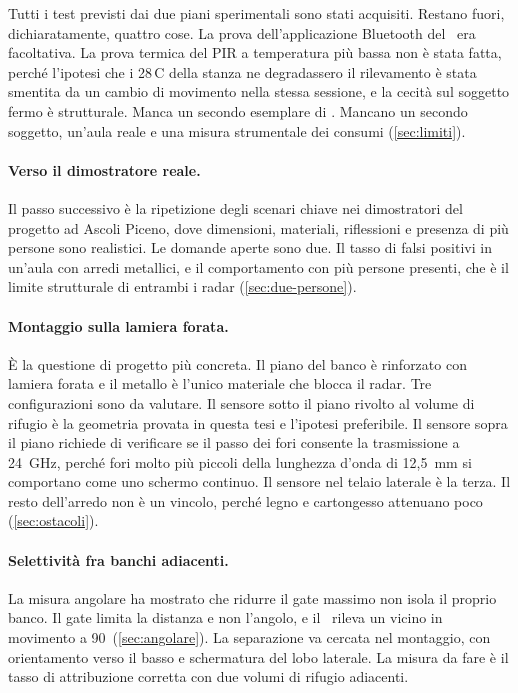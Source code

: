 Tutti i test previsti dai due piani sperimentali sono stati acquisiti. Restano fuori,
dichiaratamente, quattro cose. La prova dell'applicazione Bluetooth del \ldb\ era
facoltativa. La prova termica del PIR a temperatura più bassa non è stata fatta,
perché l'ipotesi che i 28\,\textdegree C della stanza ne degradassero il rilevamento è
stata smentita da un cambio di movimento nella stessa sessione, e la cecità sul
soggetto fermo è strutturale. Manca un secondo esemplare di \ldc. Mancano un secondo
soggetto, un'aula reale e una misura strumentale dei consumi (\cref{sec:limiti}).

\paragraph{Verso il dimostratore reale.} Il passo successivo è la ripetizione degli
scenari chiave nei dimostratori del progetto ad Ascoli Piceno, dove dimensioni,
materiali, riflessioni e presenza di più persone sono realistici. Le domande aperte
sono due. Il tasso di falsi positivi in un'aula con arredi metallici, e il
comportamento con più persone presenti, che è il limite strutturale di entrambi i
radar (\cref{sec:due-persone}).

\paragraph{Montaggio sulla lamiera forata.} È la questione di progetto più concreta.
Il piano del banco è rinforzato con lamiera forata e il metallo è l'unico materiale
che blocca il radar. Tre configurazioni sono da valutare. Il sensore sotto il piano
rivolto al volume di rifugio è la geometria provata in questa tesi e l'ipotesi
preferibile. Il sensore sopra il piano richiede di verificare se il passo dei fori
consente la trasmissione a 24~GHz, perché fori molto più piccoli della lunghezza
d'onda di 12,5~mm si comportano come uno schermo continuo. Il sensore nel telaio
laterale è la terza. Il resto dell'arredo non è un vincolo, perché legno e cartongesso
attenuano poco (\cref{sec:ostacoli}).

\paragraph{Selettività fra banchi adiacenti.} La misura angolare ha mostrato che
ridurre il gate massimo non isola il proprio banco. Il gate limita la distanza e non
l'angolo, e il \ldb\ rileva un vicino in movimento a 90\textdegree\
(\cref{sec:angolare}). La separazione va cercata nel montaggio, con orientamento verso
il basso e schermatura del lobo laterale. La misura da fare è il tasso di attribuzione
corretta con due volumi di rifugio adiacenti.

